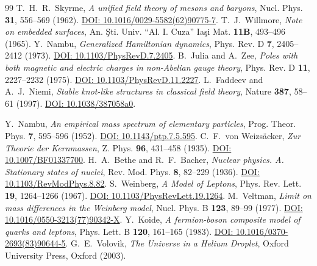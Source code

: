 \documentclass[11pt,a4paper]{article}
\theoremstyle{definition}
\theoremstyle{remark}
\begin{document}
\begin{thebibliography}{99}
	 T.~H.~R.~Skyrme, \textit{A unified field theory of mesons and baryons}, Nucl. Phys. \textbf{31}, 556--569 (1962). \href{https://doi.org/10.1016/0029-5582(62)90775-7}{DOI: 10.1016/0029-5582(62)90775-7}.
	 T.~J.~Willmore, \textit{Note on embedded surfaces}, An. {\c S}ti. Univ. ``Al. I. Cuza'' Ia{\c s}i Mat. \textbf{11B}, 493--496 (1965).
	 Y.~Nambu, \textit{Generalized Hamiltonian dynamics}, Phys. Rev. D \textbf{7}, 2405--2412 (1973). \href{https://doi.org/10.1103/PhysRevD.7.2405}{DOI: 10.1103/PhysRevD.7.2405}.
	 B.~Julia and A.~Zee, \textit{Poles with both magnetic and electric charges in non-Abelian gauge theory}, Phys. Rev. D \textbf{11}, 2227--2232 (1975). \href{https://doi.org/10.1103/PhysRevD.11.2227}{DOI: 10.1103/PhysRevD.11.2227}.
	 L.~Faddeev and A.~J.~Niemi, \textit{Stable knot-like structures in classical field theory}, Nature \textbf{387}, 58--61 (1997). \href{https://doi.org/10.1038/387058a0}{DOI: 10.1038/387058a0}.
	
	 Y.~Nambu, \textit{An empirical mass spectrum of elementary particles}, Prog. Theor. Phys. \textbf{7}, 595--596 (1952). \href{https://doi.org/10.1143/ptp.7.5.595}{DOI: 10.1143/ptp.7.5.595}.
	 C.~F.~von Weizs{\"a}cker, \textit{Zur Theorie der Kernmassen}, Z. Phys. \textbf{96}, 431--458 (1935). \href{https://doi.org/10.1007/BF01337700}{DOI: 10.1007/BF01337700}.
	 H.~A.~Bethe and R.~F.~Bacher, \textit{Nuclear physics. A. Stationary states of nuclei}, Rev. Mod. Phys. \textbf{8}, 82--229 (1936). \href{https://doi.org/10.1103/RevModPhys.8.82}{DOI: 10.1103/RevModPhys.8.82}.
	 S.~Weinberg, \textit{A Model of Leptons}, Phys. Rev. Lett. \textbf{19}, 1264--1266 (1967). \href{https://doi.org/10.1103/PhysRevLett.19.1264}{DOI: 10.1103/PhysRevLett.19.1264}.
	 M.~Veltman, \textit{Limit on mass differences in the Weinberg model}, Nucl. Phys. B \textbf{123}, 89--99 (1977). \href{https://doi.org/10.1016/0550-3213(77)90342-X}{DOI: 10.1016/0550-3213(77)90342-X}.
	 Y.~Koide, \textit{A fermion-boson composite model of quarks and leptons}, Phys. Lett. B \textbf{120}, 161--165 (1983). \href{https://doi.org/10.1016/0370-2693(83)90644-5}{DOI: 10.1016/0370-2693(83)90644-5}.
	 G.~E.~Volovik, \textit{The Universe in a Helium Droplet}, Oxford University Press, Oxford (2003).
	

\end{thebibliography}
\end{document}
